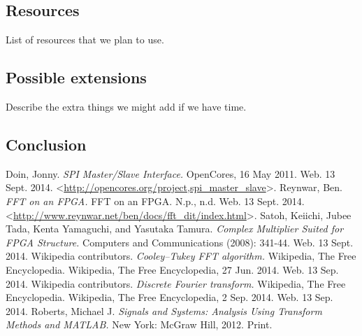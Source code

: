 \documentclass[12pt]{article}
\begin{document}
  \subsection*{Resources}
    List of resources that we plan to use.
  \subsection*{Possible extensions}
    Describe the extra things we might add if we have time.
  \subsection*{Conclusion}

  \begin{thebibliography}{9}
      Doin, Jonny. \emph{SPI Master/Slave Interface.} OpenCores, 16 May 2011. Web. 13 Sept. 2014. \textless\url{http://opencores.org/project,spi_master_slave}\textgreater.
      Reynwar, Ben. \emph{FFT on an FPGA.} FFT on an FPGA. N.p., n.d. Web. 13 Sept. 2014. \textless\url{http://www.reynwar.net/ben/docs/fft_dit/index.html}\textgreater.
      Satoh, Keiichi, Jubee Tada, Kenta Yamaguchi, and Yasutaka Tamura. \emph{Complex Multiplier Suited for FPGA Structure.} Computers and Communications (2008): 341-44. Web. 13 Sept. 2014.
      Wikipedia contributors. \emph{Cooley–Tukey FFT algorithm.} Wikipedia, The Free Encyclopedia. Wikipedia, The Free Encyclopedia, 27 Jun. 2014. Web. 13 Sep. 2014.
      Wikipedia contributors. \emph{Discrete Fourier transform.} Wikipedia, The Free Encyclopedia. Wikipedia, The Free Encyclopedia, 2 Sep. 2014. Web. 13 Sep. 2014.
      Roberts, Michael J. \emph{Signals and Systems: Analysis Using Transform Methods and MATLAB.} New York: McGraw Hill, 2012. Print.
  \end{thebibliography}
\end{document}
